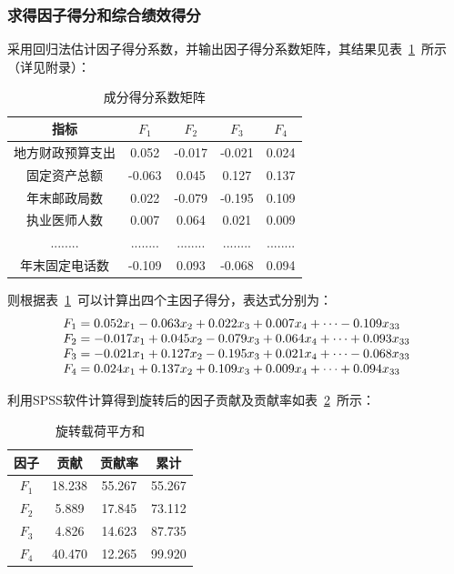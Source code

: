\documentclass{whutmod}
\begin{document}
	\subsubsection{求得因子得分和综合绩效得分}
	采用回归法估计因子得分系数，并输出因子得分系数矩阵，其结果见表~\ref{defenyinzi}~所示（详见附录）：
				\begin{table}[H]
		\centering
		\caption{成分得分系数矩阵}\label{defenyinzi}
		\begin{tabular}{ccccc}
			\toprule[2pt]
			\multicolumn{1}{m{2cm}}{\centering 指标} &
			\multicolumn{1}{m{1cm}}{\centering $F_{1}$} & \multicolumn{1}{m{1cm}}{\centering $F_{2}$} & \multicolumn{1}{m{1cm}}{\centering $F_{3}$}&
			\multicolumn{1}{m{1cm}}{\centering $F_{4}$}\\
			\midrule[1pt]
			地方财政预算支出&0.052 & -0.017 & -0.021&0.024\\ 
			固定资产总额&-0.063 & 0.045 &0.127&0.137\\ 
			年末邮政局数&0.022 &-0.079  &-0.195&0.109\\ 
			执业医师人数&0.007 &0.064 &0.021 &0.009\\ 
			........& ........&  ........ &........ &........ \\ 
			年末固定电话数&-0.109 &0.093 &-0.068 &0.094 \\
			\bottomrule[2pt]
		\end{tabular}
	\end{table}
	则根据表~\ref{defenyinzi}~可以计算出四个主因子得分，表达式分别为：
	\begin{gather}
	\begin{matrix}
	F_{1}=0.052x_{1}-0.063x_{2}+0.022x_{3}+0.007x_{4}+\cdots-0.109x_{33}\hfill\\ 
	F_{2}=-0.017x_{1}+0.045x_{2}-0.079x_{3}+0.064x_{4}+\cdots+0.093x_{33}\hfill\\ 
	F_{3}=-0.021x_{1}+0.127x_{2}-0.195x_{3}+0.021x_{4}+\cdots-0.068x_{33}\hfill\\ 
	F_{4}=0.024x_{1}+0.137x_{2}+0.109x_{3}+0.009x_{4}+\cdots+0.094x_{33}\hfill
	\end{matrix}
	\end{gather}
	
	利用SPSS软件计算得到旋转后的因子贡献及贡献率如表~\ref{fff}~所示：
			\begin{table}[H]
	\centering
	\caption{旋转载荷平方和}\label{fff}
	\begin{tabular}{cccc}
		\toprule[2pt]
		\multicolumn{1}{m{2cm}}{\centering 因子}&
		\multicolumn{1}{m{2cm}}{\centering 贡献} & \multicolumn{1}{m{2cm}}{\centering 贡献率} & \multicolumn{1}{m{2cm}}{\centering 累计}\\
		\midrule[1pt]
		$F_{1}$	 &  18.238 & 55.267&55.267\\ 
		$F_{2}$ &  5.889 & 17.845&73.112\\ 
		$F_{3}$	 &  4.826 &14.623&87.735\\ 
		$F_{4}$  &  40.470& 12.265&99.920\\ 
		\bottomrule[2pt]
	\end{tabular}
\end{table}
	
\end{document}
